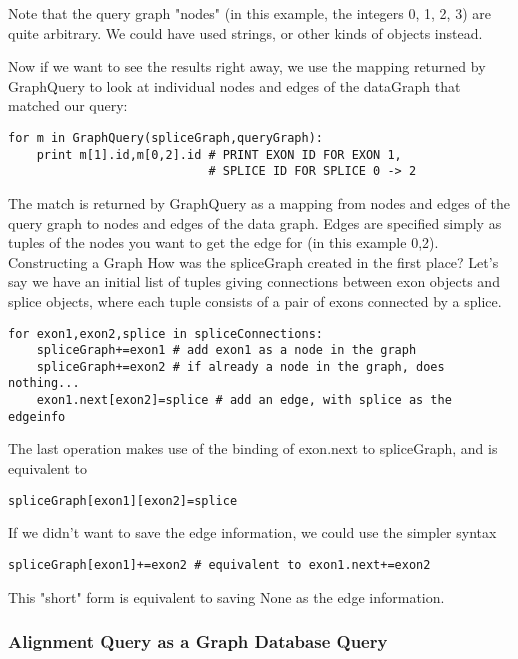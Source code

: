 \documentclass{howto}
\begin{document}
Note that the query graph "nodes" (in this example, the integers 0, 1, 2, 3) are
quite arbitrary.  We could have used strings, or other kinds of objects instead.

Now if we want to see the results right away, we use the mapping returned by GraphQuery to look at individual nodes and edges of the dataGraph that matched our query:

\begin{verbatim}
for m in GraphQuery(spliceGraph,queryGraph):
    print m[1].id,m[0,2].id # PRINT EXON ID FOR EXON 1,
                            # SPLICE ID FOR SPLICE 0 -> 2
\end{verbatim}

The match is returned by GraphQuery as a mapping from nodes and edges of the query graph to nodes and edges of the data graph.  Edges are specified simply as tuples of the nodes you want to get the edge for (in this example 0,2).
Constructing a Graph
How was the spliceGraph created in the first place?  Let's say we have an initial list of tuples giving connections between exon objects and splice objects, where each tuple consists of a pair of exons connected by a splice.

\begin{verbatim}
for exon1,exon2,splice in spliceConnections: 
    spliceGraph+=exon1 # add exon1 as a node in the graph
    spliceGraph+=exon2 # if already a node in the graph, does nothing...
    exon1.next[exon2]=splice # add an edge, with splice as the edgeinfo
\end{verbatim}

The last operation makes use of the binding of exon.next to spliceGraph, and is equivalent to

\begin{verbatim}
spliceGraph[exon1][exon2]=splice
\end{verbatim}

If we didn't want to save the edge information, we could use the simpler syntax

\begin{verbatim}
spliceGraph[exon1]+=exon2 # equivalent to exon1.next+=exon2
\end{verbatim}

This "short" form is equivalent to saving None as the edge information.


\subsubsection{Alignment Query as a Graph Database Query}
\end{document}
